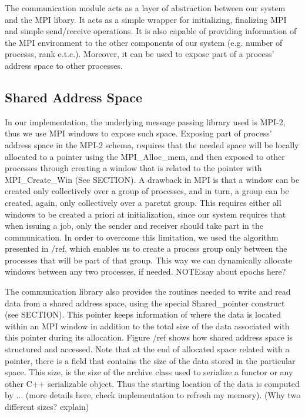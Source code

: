 The communication module acts as a layer of abstraction between our system and the MPI libary.  It acts as
a simple wrapper for initializing, finalizing MPI and simple send/receive operations.
It is also capable of providing information of the MPI environment to the other components of our system (e.g.
number of processs, rank e.t.c.).  Moreover, it can be used to expose part of a process' address space to other 
processes.  

\subsection{Shared Address Space}
In our implementation, the underlying message passing library used is MPI-2, thus we use MPI windows to
expose such space.  Exposing part of process' address space in the MPI-2 schema, requires that the needed
space will be locally allocated to a pointer using the MPI\_Alloc\_mem, and then exposed to other processes
through creating a window that is related to the pointer with MPI\_Create\_Win (See SECTION). 
A drawback in MPI is that a window can be created only collectively over a group of processes,
and in turn, a group can be created, again, only collectively over a paretnt group. 
This requires either all windows to be created a priori at initialization, since our system requires that when
issuing a job, only the sender and receiver should take part in the communication.  
In order to overcome this limitation, we used the algorithm presented in /ref, which
enables us to create a process group only between the processes that will be part of that group.  This way we 
can dynamically allocate windows between any two processes, if needed.
NOTE:say about epochs here?


The communication library also provides the routines needed to write and read data from a shared address space,
using the special Shared\_pointer construct (see SECTION).  This pointer keeps information of where the data is
located within an MPI window in addition to the total size of the data associated with this pointer during its 
allocation. Figure /ref shows how shared address space is structured and accessed.  Note that at the end of 
allocated space related with a pointer, there is a field that contains the size of the data stored in the 
particular space.  This size, is the size of the archive class used to serialize a functor or any other C++
serializable object.  Thus the starting location of the data is computed by ... (more details here, check
implementation to refresh my memory). (Why two different sizes? explain)

